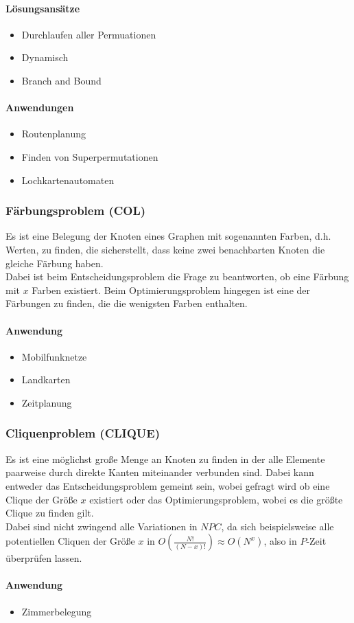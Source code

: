 \documentclass{article}
\begin{document}
\paragraph*{Lösungsansätze}
\begin{itemize}
    \item Durchlaufen aller Permuationen
    \item Dynamisch
    \item Branch and Bound
\end{itemize}
\paragraph*{Anwendungen}
\begin{itemize}
    \item Routenplanung
    \item Finden von Superpermutationen
    \item Lochkartenautomaten
\end{itemize}
\subsubsection{Färbungsproblem (COL)}
Es ist eine Belegung der Knoten eines Graphen mit sogenannten Farben, d.h. Werten, zu finden, die sicherstellt, dass keine zwei benachbarten Knoten die gleiche Färbung haben. \\
\indent Dabei ist beim Entscheidungsproblem die Frage zu beantworten, ob eine Färbung mit $x$ Farben existiert. Beim Optimierungsproblem hingegen ist eine der Färbungen zu finden, die die wenigsten Farben enthalten.
\paragraph*{Anwendung}
\begin{itemize}
    \item Mobilfunknetze
    \item Landkarten
    \item Zeitplanung
\end{itemize}
\subsubsection{Cliquenproblem (CLIQUE)}
Es ist eine möglichst große Menge an Knoten zu finden in der alle Elemente paarweise durch direkte Kanten miteinander verbunden sind. Dabei kann entweder das Entscheidungsproblem gemeint sein, wobei gefragt wird ob eine Clique der Größe $x$ existiert oder das Optimierungsproblem, wobei es die größte Clique zu finden gilt.\\
\indent Dabei sind nicht zwingend alle Variationen in $NPC$, da sich beispielsweise alle potentiellen Cliquen der Größe $x$ in $O(\frac{N!}{(N-x)!})\approx O(N^x)$, also in $P$-Zeit überprüfen lassen.
\paragraph*{Anwendung}
\begin{itemize}
    \item Zimmerbelegung
\end{itemize}
\end{document}
